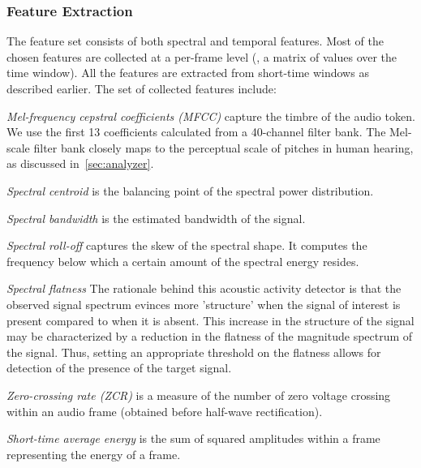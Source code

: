 \subsubsection{Feature Extraction}
\label{sec:representation::extraction}

The feature set consists of both spectral and temporal features. 
%
Most of the chosen features are collected at a per-frame level (\ie, 
a matrix of values over the time window). 
%
All the features are extracted from short-time windows as described earlier.
%
The set of collected features include:

\squishitemize

\item \textit{Mel-frequency cepstral coefficients (MFCC)} capture the timbre
of the audio token. 
%
We use the first 13 coefficients calculated from a 40-channel filter bank.
%
The Mel-scale filter bank closely maps to the perceptual scale of pitches in
human hearing, as discussed in~\cref{sec:analyzer}. 

\item \textit{Spectral centroid} is the balancing point of the spectral power
distribution.

\item \textit{Spectral bandwidth} is the estimated bandwidth of the signal.

\item \textit{Spectral roll-off} captures the skew of the spectral shape. It
computes the frequency below which a certain amount of the spectral energy
resides.

\item \textit{Spectral flatness} The rationale behind this acoustic activity
detector is that the observed signal spectrum evinces more 'structure' when the
signal of interest is present compared to when it is absent.
%
This increase in the structure of the signal may be characterized by a 
reduction in the flatness of the magnitude spectrum of the signal.
%
Thus, setting an appropriate threshold on the flatness allows for detection of
the presence of the target signal.

\item \textit{Zero-crossing rate (ZCR)} is a measure of the number of zero
voltage crossing within an audio frame (obtained before half-wave
rectification).

\item \textit{Short-time average energy} is the sum of squared amplitudes 
within a frame representing the energy of a frame.

